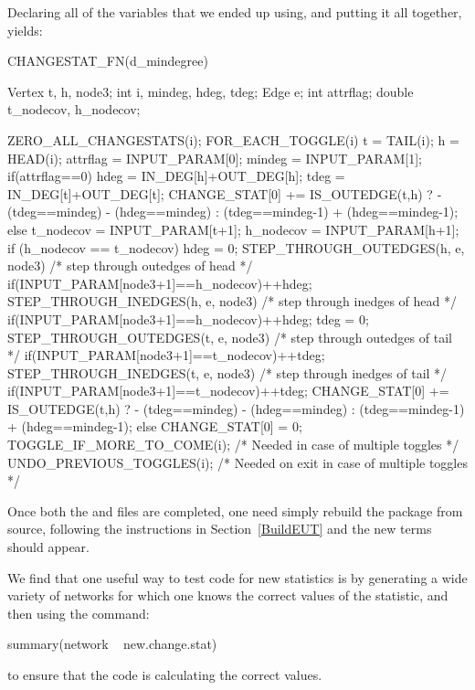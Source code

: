 \documentclass[nojss]{jss}
\begin{document}
Declaring all of the variables that we ended up using, and putting it all
together, yields:
\begin{CodeChunk}
\begin{CodeInput}
CHANGESTAT_FN(d_mindegree) {
  Vertex t, h, node3;
  int i, mindeg, hdeg, tdeg;
  Edge e;
  int attrflag;
  double t_nodecov, h_nodecov;

  ZERO_ALL_CHANGESTATS(i);
  FOR_EACH_TOGGLE(i) {
    t = TAIL(i); h = HEAD(i);
    attrflag = INPUT_PARAM[0];
    mindeg = INPUT_PARAM[1];
    if(attrflag==0){
      hdeg = IN_DEG[h]+OUT_DEG[h];
      tdeg = IN_DEG[t]+OUT_DEG[t];
      CHANGE_STAT[0] += IS_OUTEDGE(t,h) ?
        - (tdeg==mindeg) - (hdeg==mindeg) :
        (tdeg==mindeg-1) + (hdeg==mindeg-1);
    }else{
      t_nodecov = INPUT_PARAM[t+1];
      h_nodecov = INPUT_PARAM[h+1];
      if (h_nodecov == t_nodecov) {
        hdeg = 0;
        STEP_THROUGH_OUTEDGES(h, e, node3) { /* step through outedges of head */
          if(INPUT_PARAM[node3+1]==h_nodecov){++hdeg;}
        }
        STEP_THROUGH_INEDGES(h, e, node3) { /* step through inedges of head */
          if(INPUT_PARAM[node3+1]==h_nodecov){++hdeg;}
        }
        tdeg = 0;
        STEP_THROUGH_OUTEDGES(t, e, node3) { /* step through outedges of tail */
          if(INPUT_PARAM[node3+1]==t_nodecov){++tdeg;}
        }
        STEP_THROUGH_INEDGES(t, e, node3) { /* step through inedges of tail */
          if(INPUT_PARAM[node3+1]==t_nodecov){++tdeg;}
        }
        CHANGE_STAT[0] += IS_OUTEDGE(t,h) ?
          - (tdeg==mindeg) - (hdeg==mindeg) :
          (tdeg==mindeg-1) + (hdeg==mindeg-1);
      }else{
        CHANGE_STAT[0] = 0;
      }
    }
    TOGGLE_IF_MORE_TO_COME(i); /* Needed in case of multiple toggles */
  }
  UNDO_PREVIOUS_TOGGLES(i); /* Needed on exit in case of multiple toggles */
}
\end{CodeInput}
\end{CodeChunk}
Once both the  and  files are completed, one need simply rebuild the package from source, following the instructions in Section~\ref{BuildEUT} and the new terms should appear.

We find that one useful way to test code for new statistics is by generating a wide variety of networks for which one knows the correct values of the statistic, and then using the command:
\begin{CodeChunk}
\begin{CodeInput}
summary(network ~ new.change.stat)
\end{CodeInput}
\end{CodeChunk}
to ensure that the code is calculating the correct values.
\end{document}
